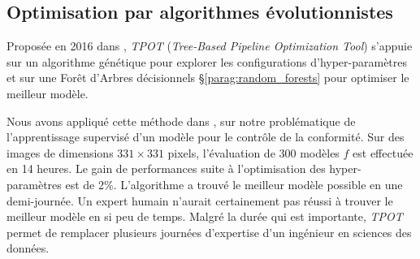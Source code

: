 \subsection{Optimisation par algorithmes évolutionnistes} \label{subsec:evolution}
Proposée en 2016 dans \citeauthor{olson_evaluation_2016, olson_automating_2016} \cite{olson_evaluation_2016, olson_automating_2016}, \textit{TPOT} (\textit{Tree-Based Pipeline Optimization Tool}) s'appuie sur un algorithme génétique pour explorer les configurations d'hyper-paramètres et sur une Forêt d'Arbres décisionnels §\ref{parag:random_forests} pour optimiser le meilleur modèle.

Nous avons appliqué cette méthode dans  \cite{nagorny_polarimetric_2019}, sur notre problématique de l'apprentissage supervisé d'un modèle pour le contrôle de la conformité.
Sur des images de dimensions $331 \times 331$ pixels, l'évaluation de 300 modèles $f$ est effectuée en 14 heures.
Le gain de performances suite à l'optimisation des hyper-paramètres est de 2\%.
L'algorithme a trouvé le meilleur modèle possible en une demi-journée.
Un expert humain n'aurait certainement pas réussi à trouver le meilleur modèle en si peu de temps.
Malgré la durée qui est importante, \textit{TPOT} permet de remplacer plusieurs journées d'expertise d'un ingénieur en sciences des données.

%
%


